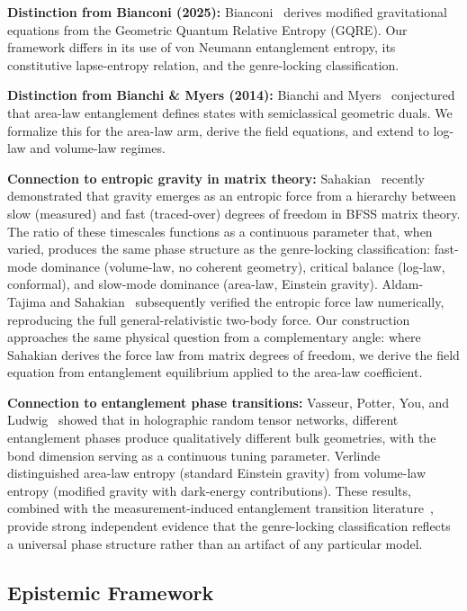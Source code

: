 \documentclass[aps,prd,twocolumn,superscriptaddress,nofootinbib,floatfix]{revtex4-2}
\begin{document}
\textbf{Distinction from Bianconi (2025):} Bianconi~\cite{Bianconi2025} derives modified gravitational equations from the Geometric Quantum Relative Entropy (GQRE). Our framework differs in its use of von Neumann entanglement entropy, its constitutive lapse-entropy relation, and the genre-locking classification.

\textbf{Distinction from Bianchi \& Myers (2014):} Bianchi and Myers~\cite{BianchiMyers2014} conjectured that area-law entanglement defines states with semiclassical geometric duals. We formalize this for the area-law arm, derive the field equations, and extend to log-law and volume-law regimes.

\textbf{Connection to entropic gravity in matrix theory:} Sahakian~\cite{Sahakian2025} recently demonstrated that gravity emerges as an entropic force from a hierarchy between slow (measured) and fast (traced-over) degrees of freedom in BFSS matrix theory. The ratio of these timescales functions as a continuous parameter that, when varied, produces the same phase structure as the genre-locking classification: fast-mode dominance (volume-law, no coherent geometry), critical balance (log-law, conformal), and slow-mode dominance (area-law, Einstein gravity). Aldam-Tajima and Sahakian~\cite{AldamTajimaSahakian2026} subsequently verified the entropic force law numerically, reproducing the full general-relativistic two-body force. Our construction approaches the same physical question from a complementary angle: where Sahakian derives the force law from matrix degrees of freedom, we derive the field equation from entanglement equilibrium applied to the area-law coefficient.

\textbf{Connection to entanglement phase transitions:} Vasseur, Potter, You, and Ludwig~\cite{VasseurPotterYouLudwig2019} showed that in holographic random tensor networks, different entanglement phases produce qualitatively different bulk geometries, with the bond dimension serving as a continuous tuning parameter. Verlinde~\cite{Verlinde2017} distinguished area-law entropy (standard Einstein gravity) from volume-law entropy (modified gravity with dark-energy contributions). These results, combined with the measurement-induced entanglement transition literature~\cite{LiChenFisher2018,GranetNahum2023}, provide strong independent evidence that the genre-locking classification reflects a universal phase structure rather than an artifact of any particular model.

\subsection{Epistemic Framework}
\end{document}

